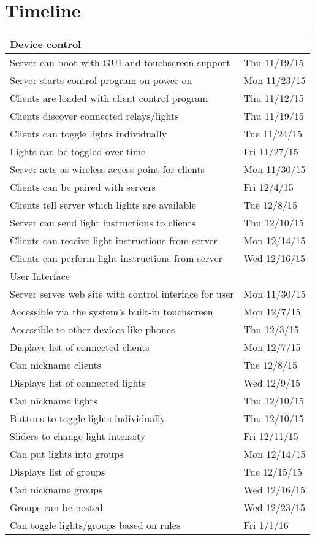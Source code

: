 \documentclass[oneside,openright]{book}
\begin{document}
\section{Timeline}
\begin{tabular}{ | l | l | }
   \hline
   \textbf{Device control} & \\ \hline

   Server can boot with GUI and touchscreen support & Thu 11/19/15 \\ \hline
   Server starts control program on power on & Mon 11/23/15 \\ \hline
   Clients are loaded with client control program & Thu 11/12/15 \\ \hline
   Clients discover connected relays/lights & Thu 11/19/15 \\ \hline
   Clients can toggle lights individually & Tue 11/24/15 \\ \hline
   Lights can be toggled over time & Fri 11/27/15 \\ \hline
   Server acts as wireless access point for clients & Mon 11/30/15 \\ \hline
   Clients can be paired with servers & Fri 12/4/15 \\ \hline
   Clients tell server which lights are available & Tue 12/8/15 \\ \hline
   Server can send light instructions to clients & Thu 12/10/15 \\ \hline
   Clients can receive light instructions from server & Mon 12/14/15 \\ \hline
   Clients can perform light instructions from server & Wed 12/16/15 \\ \hline
   
   User Interface & \\ \hline
   
   Server serves web site with control interface for user & Mon 11/30/15 \\ \hline
   Accessible via the system’s built-in touchscreen & Mon 12/7/15 \\ \hline
   Accessible to other devices like phones & Thu 12/3/15 \\ \hline
   Displays list of connected clients & Mon 12/7/15 \\ \hline
   Can nickname clients & Tue 12/8/15 \\ \hline
   Displays list of connected lights & Wed 12/9/15 \\ \hline
   Can nickname lights & Thu 12/10/15 \\ \hline
   Buttons to toggle lights individually & Thu 12/10/15 \\ \hline
   Sliders to change light intensity & Fri 12/11/15 \\ \hline
   Can put lights into groups & Mon 12/14/15 \\ \hline
   Displays list of groups & Tue 12/15/15 \\ \hline
   Can nickname groups & Wed 12/16/15 \\ \hline
   Groups can be nested & Wed 12/23/15 \\ \hline
   Can toggle lights/groups based on rules & Fri 1/1/16 \\ \hline
   

\end{tabular}
\end{document}

